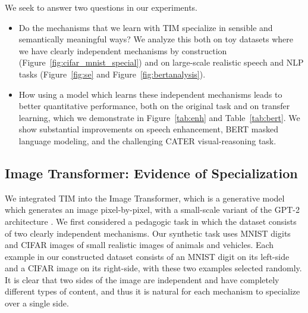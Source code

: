 \documentclass{article}
\begin{document}
We seek to answer two questions in our experiments. 
\vspace{-2mm}
\begin{itemize}
    \item Do the mechanisms that we learn with TIM specialize in sensible and semantically meaningful ways?  We analyze this both on toy datasets where we have clearly independent mechanisms by construction (Figure~\ref{fig:cifar_mnist_special}) and on large-scale realistic speech and NLP tasks (Figure~\ref{fig:se} and Figure~\ref{fig:bertanalysis}).
    \item  How using a model which learns these independent mechanisms leads to better quantitative performance, both on the original task and on transfer learning, which we demonstrate in Figure~\ref{tab:enh} and Table~\ref{tab:bert}.  We show substantial improvements on speech enhancement, BERT masked language modeling, and the challenging CATER visual-reasoning task.  
\end{itemize}



\subsection{Image Transformer: Evidence of Specialization}
\label{sec:imagetransformer}

We integrated TIM into the Image Transformer, which is a generative model which generates an image pixel-by-pixel, with a small-scale variant of the GPT-2 architecture \citep{mingpt2020,radford2019language}.  We first considered a pedagogic task in which the dataset consists of two clearly independent mechanisms.  Our synthetic task uses MNIST digits \citep{lecun1998mnist} and CIFAR images \cite{krizhevsky2009LearningML} of small realistic images of animals and vehicles.  Each example in our constructed dataset consists of an MNIST digit on its left-side and a CIFAR image on its right-side, with these two examples selected randomly. It is clear that two sides of the image are independent and have completely different types of content, and thus it is natural for each mechanism to specialize over a single side.  
\end{document}

